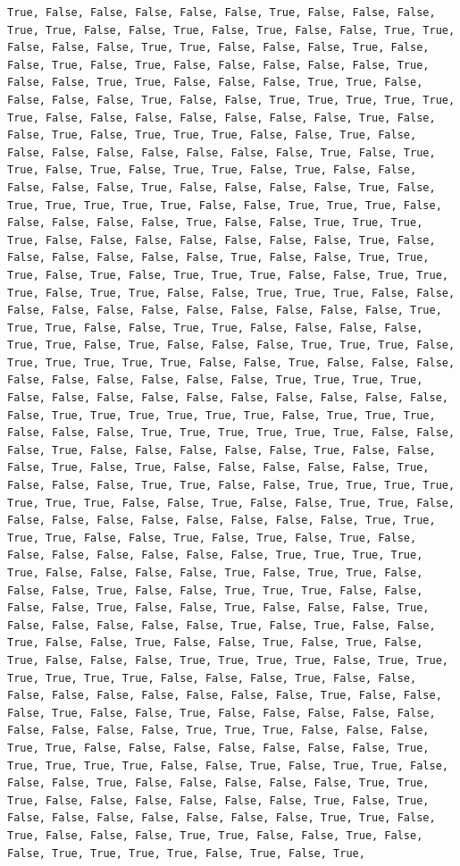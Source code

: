 \documentclass[
  letterpaper,
  DIV=11,
  numbers=noendperiod]{scrartcl}
\begin{document}
\begin{verbatim}
True, False, False, False, False, False, True, False, False, False, True, True, False, False, True, False, True, False, False, True, True, False, False, False, True, True, False, False, False, True, False, False, True, False, True, False, False, False, False, False, True, False, False, True, True, False, False, False, True, True, False, False, False, False, True, False, False, True, True, True, True, True, True, False, False, False, False, False, False, False, True, False, False, True, False, True, True, True, False, False, True, False, False, False, False, False, False, False, False, True, False, True, True, False, True, False, True, True, False, True, False, False, False, False, False, True, False, False, False, False, True, False, True, True, True, True, True, False, False, True, True, True, False, False, False, False, False, True, False, False, True, True, True, True, False, False, False, False, False, False, False, True, False, False, False, False, False, False, True, False, False, True, True, True, False, True, False, True, True, True, False, False, True, True, True, False, True, True, False, False, True, True, True, False, False, False, False, False, False, False, False, False, False, False, True, True, True, False, False, True, True, False, False, False, False, True, True, False, True, False, False, False, True, True, True, False, True, True, True, True, True, False, False, True, False, False, False, False, False, False, False, False, False, True, True, True, True, False, False, False, False, False, False, False, False, False, False, False, True, True, True, True, True, True, False, True, True, True, False, False, False, True, True, True, True, True, True, False, False, False, True, False, False, False, False, False, True, False, False, False, True, False, True, False, False, False, False, False, True, False, False, False, True, True, False, False, True, True, True, True, True, True, True, False, False, True, False, False, True, True, False, False, False, False, False, False, False, False, False, True, True, True, True, False, False, True, False, True, False, True, False, False, False, False, False, False, False, True, True, True, True, True, False, False, False, False, True, False, True, True, False, False, False, True, False, False, True, True, True, False, False, False, False, True, False, False, True, False, False, False, True, False, False, False, False, False, True, False, True, False, False, True, False, False, True, False, False, True, False, True, False, True, False, False, False, True, True, True, True, False, True, True, True, True, True, True, False, False, False, True, False, False, False, False, False, False, False, False, False, True, False, False, False, True, False, False, True, False, False, False, False, False, False, False, False, False, True, True, True, False, False, False, True, True, False, False, False, False, False, False, False, True, True, True, True, True, False, False, True, False, True, True, False, False, False, True, False, False, False, False, False, True, True, True, False, False, False, False, False, False, True, False, True, False, False, False, False, False, False, False, True, True, False, True, False, False, False, True, True, False, False, True, False, False, True, True, True, True, False, True, False, True, 
\end{verbatim}
\end{document}
